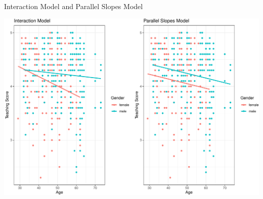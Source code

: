 \documentclass[
  ignorenonframetext,
]{beamer}
\begin{document}
\begin{frame}{Interaction Model and Parallel Slopes Model}
\protect\hypertarget{interaction-model-and-parallel-slopes-model}{}
\begin{center}\includegraphics[width=0.9\linewidth,height=0.9\textheight]{Week5_Lect_files/figure-beamer/unnamed-chunk-26-1} \end{center}
\end{frame}
\end{document}
